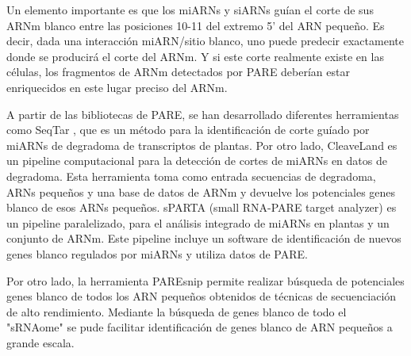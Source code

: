 Un elemento importante es que los miARNs y siARNs guían el corte de sus ARNm blanco entre las posiciones 10-11 del extremo 5' del ARN pequeño.
Es decir, dada una interacción miARN/sitio blanco, uno puede predecir exactamente donde se producirá el corte del ARNm.
Y si este corte realmente existe en las células, los fragmentos de ARNm detectados por PARE deberían estar enriquecidos en este lugar preciso del ARNm.

A partir de las bibliotecas de PARE, se han desarrollado diferentes herramientas como SeqTar \citep{pmid22140118}, que es un método para la identificación de corte guíado por miARNs de degradoma de transcriptos de plantas.
Por otro lado, CleaveLand \citep{pmid19017659} es un pipeline computacional para la detección de cortes de miARNs en datos de degradoma.
Esta herramienta toma como entrada secuencias de degradoma, ARNs pequeños y una base de datos de ARNm y devuelve los potenciales genes blanco de esos ARNs pequeños. 
sPARTA (small RNA-PARE target analyzer) \citep{pmid25120269} es un pipeline paralelizado, para el análisis integrado de miARNs en plantas y un conjunto de ARNm.
Este pipeline incluye un software de identificación de nuevos genes blanco regulados por miARNs y utiliza datos de PARE.

Por otro lado, la herramienta PAREsnip permite realizar búsqueda de potenciales genes blanco de todos los ARN pequeños obtenidos de técnicas de secuenciación de alto rendimiento.
Mediante la búsqueda de genes blanco de todo el "sRNAome" se pude facilitar identificación de genes blanco de ARN pequeños a grande escala.


